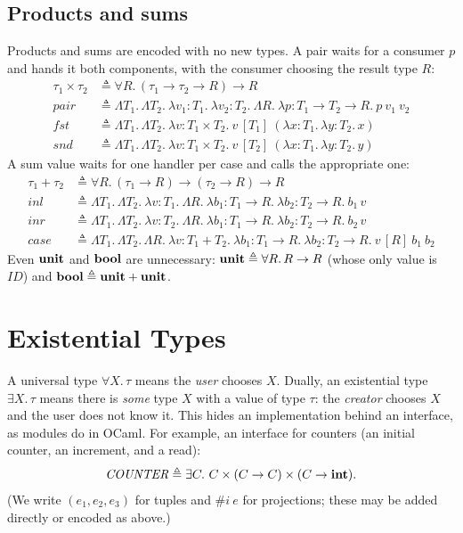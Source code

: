 \subsection{Products and sums}
Products and sums are encoded with no new types. A pair waits for a consumer $p$
and hands it both components, with the consumer choosing the result type $R$:
\begin{align*}
\tau_1 \times \tau_2 &\triangleq \forall R.\, (\tau_1 \to \tau_2 \to R) \to R \\
\mathit{pair} &\triangleq \Lambda T_1.\, \Lambda T_2.\ \lambda v_1 : T_1.\ \lambda v_2 : T_2.\
   \Lambda R.\ \lambda p : T_1 \to T_2 \to R.\ p\ v_1\ v_2 \\
\mathit{fst} &\triangleq \Lambda T_1.\, \Lambda T_2.\ \lambda v : T_1 \times T_2.\ v\,[T_1]\ (\lambda x : T_1.\, \lambda y : T_2.\, x) \\
\mathit{snd} &\triangleq \Lambda T_1.\, \Lambda T_2.\ \lambda v : T_1 \times T_2.\ v\,[T_2]\ (\lambda x : T_1.\, \lambda y : T_2.\, y)
\end{align*}
A sum value waits for one handler per case and calls the appropriate one:
\begin{align*}
\tau_1 + \tau_2 &\triangleq \forall R.\, (\tau_1 \to R) \to (\tau_2 \to R) \to R \\
\mathit{inl} &\triangleq \Lambda T_1.\, \Lambda T_2.\ \lambda v : T_1.\ \Lambda R.\ \lambda b_1 : T_1 \to R.\ \lambda b_2 : T_2 \to R.\ b_1\, v \\
\mathit{inr} &\triangleq \Lambda T_1.\, \Lambda T_2.\ \lambda v : T_2.\ \Lambda R.\ \lambda b_1 : T_1 \to R.\ \lambda b_2 : T_2 \to R.\ b_2\, v \\
\mathit{case} &\triangleq \Lambda T_1.\, \Lambda T_2.\, \Lambda R.\ \lambda v : T_1 + T_2.\ \lambda b_1 : T_1 \to R.\ \lambda b_2 : T_2 \to R.\ v\,[R]\ b_1\ b_2
\end{align*}
Even $\mathbf{unit}$ and $\mathbf{bool}$ are unnecessary: $\mathbf{unit} \triangleq \forall R.\, R \to R$
(whose only value is $\mathit{ID}$) and $\mathbf{bool} \triangleq \mathbf{unit} + \mathbf{unit}$.

\section{Existential Types}

A universal type $\forall X.\, \tau$ means the \emph{user} chooses $X$. Dually, an
existential type $\exists X.\, \tau$ means there is \emph{some} type $X$ with a
value of type $\tau$: the \emph{creator} chooses $X$ and the user does not know it.
This hides an implementation behind an interface, as modules do in OCaml. For
example, an interface for counters (an initial counter, an increment, and a read):
\[
\mathit{COUNTER} \triangleq \exists C.\ C \times (C \to C) \times (C \to \mathbf{int}).
\]
(We write $(e_1, e_2, e_3)$ for tuples and $\#i\ e$ for projections; these may be
added directly or encoded as above.)

